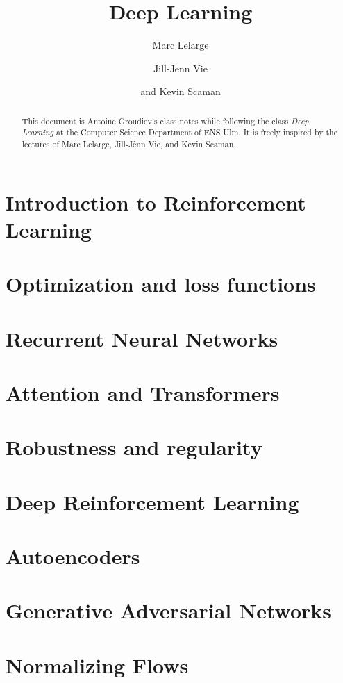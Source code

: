 \documentclass[toc, titlepaged]{../cs-classes/cs-classes}
\title{Deep Learning}
\author{Marc Lelarge\and Jill-Jenn Vie\and and Kevin Scaman}
\begin{document}
\begin{abstract}
    This document is Antoine Groudiev's class notes while following the class \emph{Deep Learning} at the Computer Science Department of ENS Ulm. It is freely inspired by the lectures of Marc Lelarge, Jill-Jênn Vie, and Kevin Scaman. 
\end{abstract}





\section{Introduction to Reinforcement Learning}

\section{Optimization and loss functions}



\section{Recurrent Neural Networks}

\section{Attention and Transformers}

\section{Robustness and regularity}

\section{Deep Reinforcement Learning}

\section{Autoencoders}

\section{Generative Adversarial Networks}

\section{Normalizing Flows}
\end{document}
